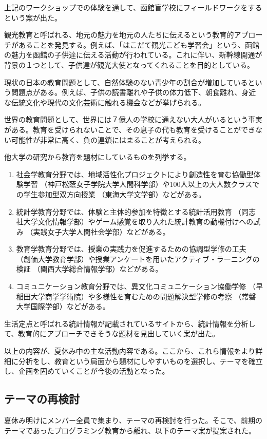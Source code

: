 \documentclass[openany,11pt,papersize]{jsbook}
\begin{document}
\par 上記のワークショップでの体験を通して、函館盲学校にフィールドワークをするという案が出た。
\par 観光教育と呼ばれる、地元の魅力を地元の人たちに伝えるという教育的アプローチがあることを発見する。例えば、「はこだて観光こども学習会」という、函館の魅力を函館の子供達に伝える活動が行われている。これに伴い、新幹線開通が背景の１つとして、子供達が観光大使となってくれることを目的としている。
\par 現状の日本の教育問題として、自然体験のない青少年の割合が増加しているという問題点がある。例えば、子供の読書離れや子供の体力低下、朝食離れ、身近な伝統文化や現代の文化芸術に触れる機会などが挙げられる。
\par 世界の教育問題として、世界には７億人の学校に通えない大人がいるという事実がある。教育を受けられないことで、その息子の代も教育を受けることができない可能性が非常に高く、負の連鎖にはまることが考えられる。
\par 他大学の研究から教育を題材にしているものを列挙する。
\begin{enumerate}
\item 社会学教育分野では、地域活性化プロジェクトにより創造性を育む協働型体験学習 （神戸松蔭女子学院大学人間科学部）や100人以上の大人数クラスでの学生参加型双方向授業 （東海大学文学部）などがある。
\item 統計学教育分野では、体験と主体的参加を特徴とする統計活用教育 （同志社大学文化情報学部）やゲーム感覚を取り入れた統計教育の動機付けへの試み （実践女子大学人間社会学部）などがある。
\item 教育学教育分野では、授業の実践力を促進するための協調型学修の工夫 （創価大学教育学部）や授業アンケートを用いたアクティブ・ラーニングの検証 （関西大学総合情報学部）などがある。
\item コミュニケーション教育分野では、異文化コミュニケーション協働学修 （早稲田大学商学学術院）や多様性を育むための問題解決型学修の考察 （常磐大学国際学部）などがある。
\end{enumerate}
\par 生活定点と呼ばれる統計情報が記載されているサイトから、統計情報を分析して、教育的にアプローチできそうな題材を見出していく案が出た。
\par 以上の内容が、夏休み中の主な活動内容である。ここから、これら情報をより詳細に分析をし、教育という局面から題材にしやすいものを選択し、テーマを確立し、企画を固めていくことが今後の活動となった。


\subsection{テーマの再検討}
夏休み明けにメンバー全員で集まり、テーマの再検討を行った。そこで、前期のテーマであったプログラミング教育から離れ、以下のテーマ案が提案された。
\end{document}
